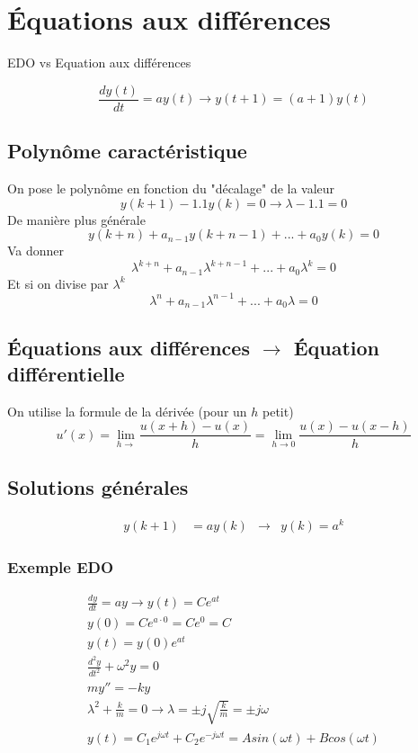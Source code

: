 \documentclass[resume]{subfiles}
\begin{document}
\section{Équations aux différences}

EDO vs Equation aux différences

$$\frac{dy(t)}{dt} = ay(t) \rightarrow y(t+1)=(a+1)y(t)$$


\subsection{Polynôme caractéristique}
On pose le polynôme en fonction du "décalage" de la valeur
$$y(k+1)-1.1y(k)=0\longrightarrow \lambda-1.1=0$$
De manière plus générale
$$y(k + n) + a_{n-1}y(k + n-1) +...+ a_0y(k) = 0$$
Va donner
$$\lambda^{k+n} + a_{n-1}\lambda^{k+n-1} + . . . + a_0\lambda^k = 0$$
Et si on divise par $\lambda^{k}$
$$\lambda^{n} + a_{n-1}\lambda^{n-1} + . . . + a_0\lambda = 0$$



\subsection{Équations aux différences $\longrightarrow$ Équation différentielle}
On utilise la formule de la dérivée (pour un $h$ petit)
$$u'(x)=\lim_{h\to }\frac{u(x+h)-u(x)}{h}=\lim_{h\to 0}\frac{u(x)-u(x-h)}{h}$$


\subsection{Solutions générales}
\begin{align*}
y(k+1)&= ay(k) & \longrightarrow & y(k)=a^{k}
\end{align*}





\subsubsection{Exemple EDO}
\begin{multline*}
\frac{dy}{dt} = ay \rightarrow y(t) = Ce^{at}\\
y(0) = Ce^{a\cdot 0} = Ce^0 = C\\
y(t) = y(0)e^{at}\\
\frac{d^2y}{dt^2} + \omega^2y = 0\\
my'' = -ky\\
\lambda^2 + \frac{k}{m}=0 \rightarrow \lambda = \pm j\sqrt{\frac{k}{m}}=\pm j\omega\\
y(t)=C_1 e^{j\omega t}+C_2 e^{-j\omega t} = Asin(\omega t)+Bcos(\omega t)
\end{multline*}
\end{document}
